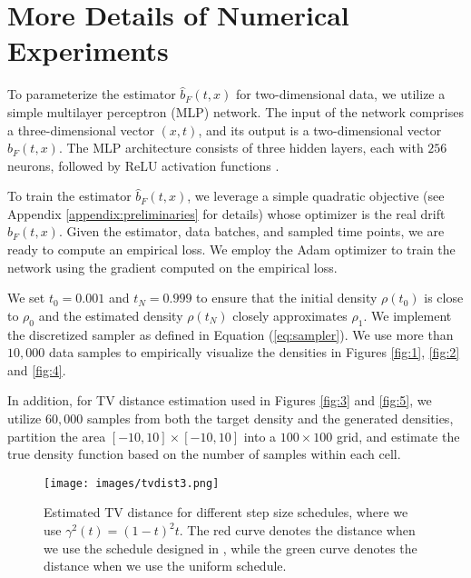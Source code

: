 
\section{More Details of Numerical Experiments}
\label{appendix:experiments}


To parameterize the estimator $\hat{b}_F(t,x)$ for two-dimensional data, we utilize a simple multilayer perceptron (MLP) network. The input of the network comprises a three-dimensional vector $(x,t)$, and its output is a two-dimensional vector $\hat{b}_F(t,x)$. The MLP architecture consists of three hidden layers, each with $256$ neurons, followed by ReLU activation functions \cite{nair2010rectified}. 

To train the estimator $\hat{b}_F(t,x)$, we leverage a simple quadratic objective (see Appendix \ref{appendix:preliminaries} for details) whose optimizer is the real drift $b_F(t,x)$. Given the estimator, data batches, and sampled time points, we are ready to compute an empirical loss. We employ the Adam optimizer \cite{adam} to train the network using the gradient computed on the empirical loss. 

We set $t_0=0.001$ and $t_N=0.999$ to ensure that the initial density $\rho(t_0)$ is close to $\rho_0$ and the estimated density $\rho(t_N)$ closely approximates $\rho_1$. We implement the discretized sampler as defined in Equation (\ref{eq:sampler}). We use more than $10,000$ data samples to empirically visualize the densities in Figures \ref{fig:1}, \ref{fig:2} and \ref{fig:4}.

In addition, for TV distance estimation used in Figures \ref{fig:3} and \ref{fig:5}, we utilize $60,000$ samples from both the target density and the generated densities, partition the area $[-10,10]\times[-10,10]$ into a $100\times100$ grid, and estimate the true density function based on the number of samples within each cell.

\begin{figure}[htb]
    \centering
    \texttt{[image: images/tvdist3.png]}
    \caption{Estimated TV distance for different step size schedules, where we use $\gamma^2(t)=(1-t)^2t$. The red curve denotes the distance when we use the schedule designed in , while the green curve denotes the distance when we use the uniform schedule.}
    \label{fig:a1}
\end{figure}


